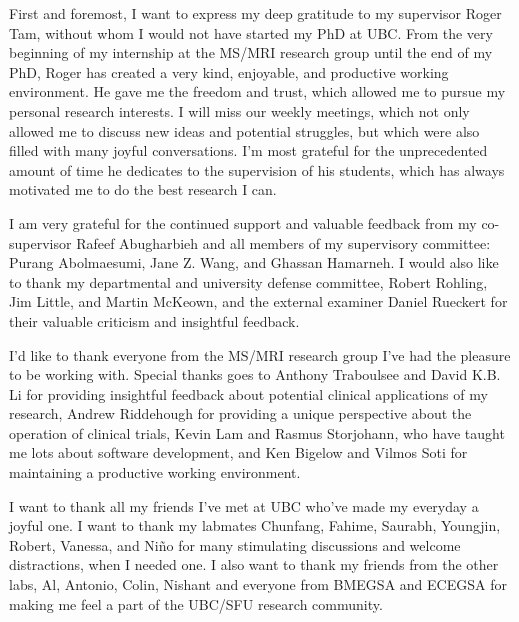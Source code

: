 





First and foremost, I want to express my deep gratitude to my supervisor Roger
Tam, without whom I would not have started my PhD at UBC. From the very
beginning of my internship at the MS/MRI research group until the end of my PhD,
Roger has created a very kind, enjoyable, and productive working environment. He
gave me the freedom and trust, which allowed me to pursue my personal research
interests. I will miss our weekly meetings, which not only allowed me to discuss
new ideas and potential struggles, but which were also filled with many joyful
conversations.  I'm most grateful for the unprecedented amount of time he
dedicates to the supervision of his students, which has always motivated me to
do the best research I can.

I am very grateful for the continued support and valuable feedback from my
co-supervisor Rafeef Abugharbieh and all members of my supervisory committee:
Purang Abolmaesumi, Jane Z. Wang,  and Ghassan Hamarneh. I would also like to
thank my departmental and university defense committee, Robert Rohling, Jim
Little, and Martin McKeown, and the external examiner Daniel Rueckert for their
valuable criticism and insightful feedback.

I'd like to thank everyone from the MS/MRI research group I've had the pleasure
to be working with. Special thanks goes to Anthony Traboulsee and David K.B. Li for
providing insightful feedback about potential clinical applications of my
research, Andrew Riddehough for providing a unique perspective about the
operation of clinical trials, Kevin Lam and Rasmus Storjohann, who have taught
me lots about software development, and Ken Bigelow and Vilmos Soti for
maintaining a productive working environment.

I want to thank all my friends I've met at UBC who've made my everyday a
joyful one. I want to thank my labmates Chunfang, Fahime, Saurabh, Youngjin,
Robert, Vanessa, and Ni\~no for many stimulating discussions and welcome
distractions, when I needed one. I also want to thank my friends from the other
labs, Al, Antonio, Colin, Nishant and everyone from BMEGSA and ECEGSA for making
me feel a part of the UBC/SFU research community.

